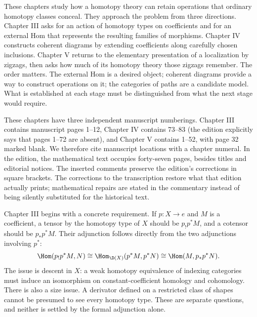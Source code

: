 These chapters study how a homotopy theory can retain operations that
ordinary homotopy classes conceal. They approach the problem from three directions.
Chapter III asks for an action of homotopy types on coefficients and for an
external Hom that represents the resulting families of morphisms. Chapter IV
constructs coherent diagrams by extending coefficients along carefully chosen
inclusions. Chapter V returns to the elementary presentation of a localization
by zigzags, then asks how much of its homotopy theory those zigzags remember.
The order matters. The external Hom is a desired object; coherent diagrams
provide a way to construct operations on it; the categories of paths are a
candidate model. What is established at each stage must be distinguished from
what the next stage would require.

These chapters have three independent manuscript numberings. Chapter III
contains manuscript pages 1--12, Chapter IV contains 73--83 (the edition
explicitly says that pages 1--72 are absent), and Chapter V contains 1--52,
with page 32 marked blank. We therefore cite manuscript locations with a
chapter numeral. In the edition, the mathematical text occupies forty-seven pages, besides
titles and editorial notices.
The inserted comments preserve the edition's corrections in square brackets.
The corrections to the transcription restore what that edition actually prints;
mathematical repairs are stated in the commentary instead of being silently
substituted for the historical text.

Chapter III begins with a concrete requirement. If $p:X\to e$ and $M$ is a
coefficient, a tensor by the homotopy type of $X$ should be $p_!p^*M$, and a
cotensor should be $p_*p^*M$. Their adjunction follows directly from the two
adjunctions involving $p^*$:
\[
 \Hom(p_!p^*M,N)\cong\Hom_{\D(X)}(p^*M,p^*N)
 \cong\Hom(M,p_*p^*N).
\]
The issue is descent in $X$: a weak homotopy equivalence of indexing categories
must induce an isomorphism on constant-coefficient homology and cohomology.
There is also a size issue. A derivator defined on a restricted class of
shapes cannot be presumed to see every homotopy type. These are separate
questions, and neither is settled by the formal adjunction alone.

